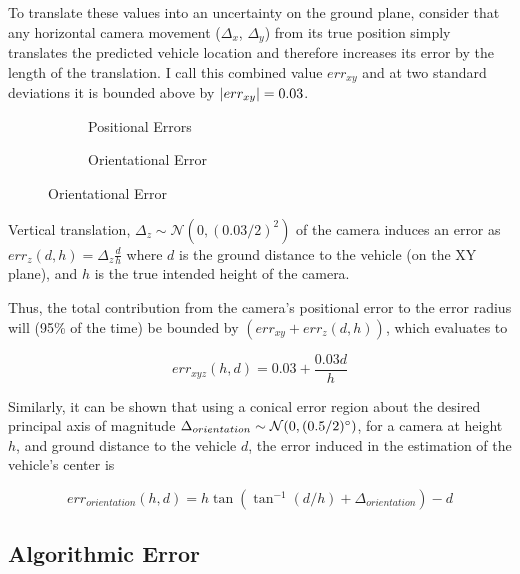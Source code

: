 \documentclass[a4paper,12pt,twoside,openright]{report}
\begin{document}
To translate these values into an uncertainty on the ground plane, consider that
any horizontal camera movement ($\Delta_{x}$, $\Delta_{y}$) from its true position simply translates
the predicted vehicle location and therefore increases its error by the length of the translation.
I call this combined value $err_{xy}$ and at two standard deviations it is bounded above by
$\abs{err_{xy}} = 0.03$.

\begin{figure}[hbh]
\centering
\begin{subfigure}[b]{.45\textwidth}
  \centering
  \resizebox{\linewidth}{!}{} 
  \caption{Positional Errors}
  \label{fig:camera:xyz error}
\end{subfigure}%
\begin{subfigure}[b]{.45\textwidth}
  \centering
  \resizebox{\linewidth}{!}{}
  \caption{Orientational Error}
  \label{fig:camera:orient error}
\end{subfigure}
\label{fig:camera:errors}
\end{figure}
Vertical translation, $\Delta_z\sim \mathcal{N}(0, (0.03/2)^2)$
of the camera induces an error as $err_{z}(d, h) = \Delta_z \frac{d}{h}$ %
where $d$ is the ground distance to the vehicle (on the XY plane), and $h$ is the true intended
height of the camera.

Thus, the total contribution from the camera's positional error to the error radius
will (95\% of the time) be bounded by $(err_{xy} + err_{z}(d, h))$, which evaluates to

\[ err_{xyz}(h, d) = 0.03 + \frac{0.03d}{h} \]

Similarly, it can be shown that using a conical error region about the desired principal axis
of magnitude $\Delta_{orientation} \sim \mathcal{N}(0,(0.5/2)\degree)$, 
for a camera at height $h$, and ground distance to the vehicle $d$, the
error induced in the estimation of the vehicle's center is 

\[ err_{orientation}(h, d) = h\tan(\tan^{-1}(d/h) + \Delta_{orientation}) - d \] %




\subsection{Algorithmic Error}
\end{document}
